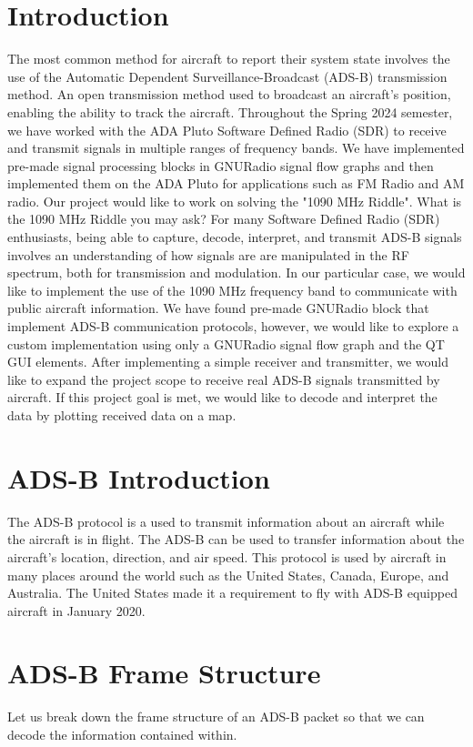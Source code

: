 \documentclass[conference]{IEEEtran}
\begin{document}
\section{Introduction}
The most common method for aircraft to report their system state involves the use of the Automatic Dependent Surveillance-Broadcast (ADS-B) transmission method.
An open transmission method used to broadcast an aircraft's position, enabling the ability to track the aircraft.
Throughout the Spring 2024 semester, we have worked with the ADA Pluto Software Defined Radio (SDR) to receive and transmit signals in multiple ranges of frequency bands.
We have implemented pre-made signal processing blocks in GNURadio signal flow graphs and then implemented them on the ADA Pluto for applications such as FM Radio and AM radio.
Our project would like to work on solving the "1090 MHz Riddle".
What is the 1090 MHz Riddle you may ask? For many Software Defined Radio (SDR) enthusiasts, being able to capture, decode, interpret, and transmit ADS-B signals involves an understanding of how signals are are manipulated in the RF spectrum, both for transmission and modulation.
In our particular case, we would like to implement the use of the 1090 MHz frequency band to communicate with public aircraft information.
We have found pre-made GNURadio block that implement ADS-B communication protocols, however, we would like to explore a custom implementation using only a GNURadio signal flow graph and the QT GUI elements.
After implementing a simple receiver and transmitter, we would like to expand the project scope to receive real ADS-B signals transmitted by aircraft.
If this project goal is met, we would like to decode and interpret the data by plotting received data on a map.

\section{ADS-B Introduction}
The ADS-B protocol is a used to transmit information about an aircraft while the aircraft is in flight. 
The ADS-B can be used to transfer information about the aircraft's location, direction, and air speed. 
This protocol is used by aircraft in many places around the world such as the United States, Canada, Europe, and Australia. 
The United States made it a requirement to fly with ADS-B equipped aircraft in January 2020. 

\section{ADS-B Frame Structure}
Let us break down the frame structure of an ADS-B packet so that we can decode the information contained within. 
\end{document}
